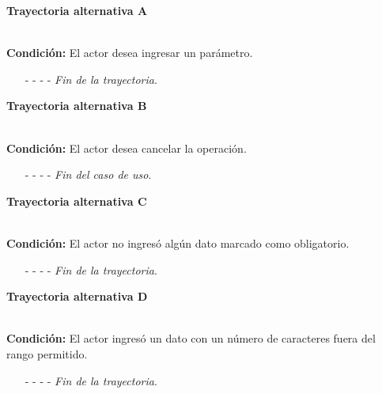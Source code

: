\hypertarget{CU9-1:TAA}{\textbf{Trayectoria alternativa A}}\\
\noindent \textbf{Condición:} El actor desea ingresar un parámetro.
\begin{enumerate}
	\UCpaso[\UCactor] Ingresa el token ''PARAM·''.
	\UCpaso[\UCsist] Muestra la pantalla .
	\UCpaso[\UCactor] Ingresa la descripción de cada parámetro. \label{CU9.1-TA2}
	\UCpaso[\UCsist] Continúa en el paso \ref{CU9.1-P4} de la trayectoria principal.
	\item[- -] - - {\em {Fin de la trayectoria}}.%
\end{enumerate}
\hypertarget{CU9-1:TAB}{\textbf{Trayectoria alternativa B}}\\
\noindent \textbf{Condición:} El actor desea cancelar la operación.
\begin{enumerate}
	\UCpaso[\UCactor] Solicita cancelar la operación oprimiendo el botón  de la pantalla .
	\UCpaso[\UCsist] Muestra la pantalla .
	\item[- -] - - {\em {Fin del caso de uso}}.%
\end{enumerate}
\hypertarget{CU9-1:TAC}{\textbf{Trayectoria alternativa C}}\\
\noindent \textbf{Condición:} El actor no ingresó algún dato marcado como obligatorio.
\begin{enumerate}
	\UCpaso[\UCsist] Muestra el mensaje  señalando el campo que presenta el error en la pantalla .
	\UCpaso Regresa al paso \ref{CU9.1-P3} de la trayectoria principal o al paso \ref{CU9.1-TA2} de la trayectoria Alternativa A.
	\item[- -] - - {\em {Fin de la trayectoria}}.%
\end{enumerate}
\hypertarget{CU9-1:TAD}{\textbf{Trayectoria alternativa D}}\\
\noindent \textbf{Condición:} El actor ingresó un dato con un número de caracteres fuera del rango permitido.
\begin{enumerate}
	\UCpaso[\UCsist] Muestra el mensaje  señalando el campo que presenta el error en la pantalla .
	\UCpaso Regresa al paso \ref{CU9.1-P3} de la trayectoria principal al paso \ref{CU9.1-TA2} de la trayectoria Alternativa A.
	\item[- -] - - {\em {Fin de la trayectoria}}.%
\end{enumerate}
